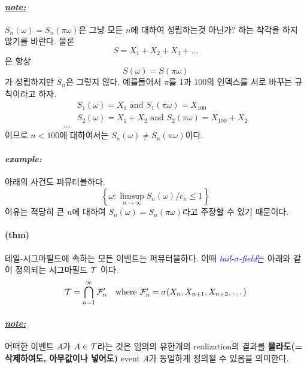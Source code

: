 \documentclass[12pt,oneside,english]{book}
\def\note{\paragraph{\Large\textit{\underline{note:}}}\Large}
\def\ex{\paragraph{\Large\textit{example:}}\Large}
\newcommand{\para}[1]{\paragraph{\Large(#1)}\Large}
\begin{document}
\note $S_n(\omega)=S_n(\pi\omega)$은 그냥 모든 $n$에 대하여 성립하는것 아닌가? 하는 착각을 하지 않기를 바란다. 물론 
\[
S=X_1+X_2+X_3+\dots
\]
은 항상 
\[
S(\omega)=S(\pi\omega)
\]가 성립하지만 $S_n$은 그렇지 않다. 예를들어서 $\pi$를 1과 100의 인덱스를 서로 바꾸는 규칙이라고 하자. 
\begin{align*}
& S_1(\omega)=X_1 \mbox{ and } S_1(\pi\omega)=X_{100} \\& S_2(\omega)=X_1+X_2 \mbox{ and } S_2(\pi\omega)=X_{100}+X_2 \\
\dots
\end{align*}
이므로 $n<100$에 대하여서는 $S_n(\omega)\neq S_n(\pi\omega)$이다. 

\ex 아래의 사건도 퍼뮤터블하다. 
\[
\left\{\omega:\limsup_{n\to\infty}S_n(\omega)/c_n \leq 1\right\}
\]
이유는 적당히 큰 $n$에 대하여 $S_n(\omega)=S_n(\pi\omega)$라고 주장할 수 있기 때문이다.

\para{thm} 테일-시그마필드에 속하는 모든 이벤트는 퍼뮤터블하다. 이때 \textcolor{blue}{\emph{tail-$\sigma$-field}}는 아래와 같이 정의되는 시그마필드 ${\cal T}$ 이다. 
\[
{\cal T}=\bigcap_{n=1}^{\infty}{\cal F}'_n \quad \mbox{where ${\cal F}'_n=\sigma(X_n,X_{n+1},X_{n+2},\dots)$}
\]

\note 어떠한 이벤트 $A$가 $A\in{\cal T}$라는 것은 임의의 유한개의 realization의 결과를 \textbf{몰라도(=삭제하여도, 아무값이나 넣어도)} event $A$가 동일하게 정의될 수 있음을 의미한다. 
\end{document}
